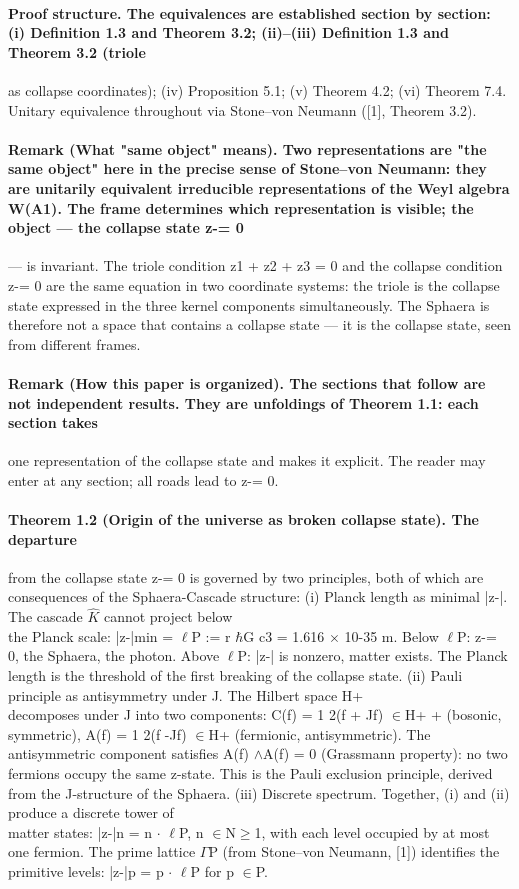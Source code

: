 \documentclass[12pt,a4paper]{article}
\begin{document}
\paragraph*{Proof structure. The equivalences are established section by section: (i) Definition 1.3 and Theorem 3.2; (ii)--(iii) Definition 1.3 and Theorem 3.2 (triole}
as collapse coordinates); (iv) Proposition 5.1; (v) Theorem 4.2; (vi) Theorem 7.4. Unitary equivalence throughout via Stone--von Neumann ([1], Theorem 3.2).
\paragraph*{Remark (What "same object" means). Two representations are "the same object" here in the precise sense of Stone--von Neumann: they are unitarily equivalent irreducible representations of the Weyl algebra W(A1). The frame determines which representation is visible; the object --- the collapse state z-= 0}
--- is invariant. The triole condition z1 + z2 + z3 = 0 and the collapse condition z-= 0 are the same equation in two coordinate systems: the triole is the collapse state expressed in the three kernel components simultaneously. The Sphaera is therefore not a space that contains a collapse state --- it is the collapse state, seen from different frames.
\paragraph*{Remark (How this paper is organized). The sections that follow are not independent results. They are unfoldings of Theorem 1.1: each section takes}
one representation of the collapse state and makes it explicit. The reader may enter at any section; all roads lead to z-= 0.
\paragraph*{Theorem 1.2 (Origin of the universe as broken collapse state). The departure}
from the collapse state z-= 0 is governed by two principles, both of which are consequences of the Sphaera-Cascade structure:
(i) Planck length as minimal |z-|. The cascade $\hat K$ cannot project below\\
the Planck scale: |z-|min = $\ell$P := r $\hbar$G c3 = 1.616 $\times$ 10-35 m. Below $\ell$P: z-= 0, the Sphaera, the photon. Above $\ell$P: |z-| is nonzero, matter exists. The Planck length is the threshold of the first breaking of the collapse state.
(ii) Pauli principle as antisymmetry under J. The Hilbert space H+\\
decomposes under J into two components: C(f) = 1 2(f + Jf) $\in$H+ + (bosonic, symmetric), A(f) = 1 2(f -Jf) $\in$H+ (fermionic, antisymmetric). The antisymmetric component satisfies A(f) $\wedge$A(f) = 0 (Grassmann property): no two fermions occupy the same z-state. This is the Pauli exclusion principle, derived from the J-structure of the Sphaera.
(iii) Discrete spectrum. Together, (i) and (ii) produce a discrete tower of\\
matter states: |z-|n = n $\cdot$ $\ell$P, n $\in$N$\geq$1, with each level occupied by at most one fermion. The prime lattice $\Gamma$P (from Stone--von Neumann, [1]) identifies the primitive levels: |z-|p = p $\cdot$ $\ell$P for p $\in$P.
\end{document}
